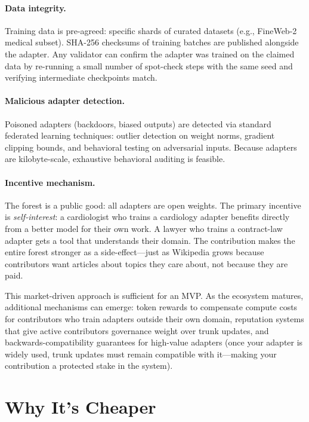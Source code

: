 \documentclass[11pt]{article}
\begin{document}
\paragraph{Data integrity.}
Training data is pre-agreed: specific shards of curated datasets (e.g.,
FineWeb-2 medical subset). SHA-256 checksums of training batches are
published alongside the adapter. Any validator can confirm the adapter was
trained on the claimed data by re-running a small number of spot-check
steps with the same seed and verifying intermediate checkpoints match.

\paragraph{Malicious adapter detection.}
Poisoned adapters (backdoors, biased outputs) are detected via standard
federated learning techniques: outlier detection on weight norms, gradient
clipping bounds, and behavioral testing on adversarial inputs. Because
adapters are kilobyte-scale, exhaustive behavioral auditing is feasible.

\paragraph{Incentive mechanism.}
The forest is a public good: all adapters are open weights. The primary
incentive is \emph{self-interest}: a cardiologist who trains a cardiology
adapter benefits directly from a better model for their own work. A lawyer
who trains a contract-law adapter gets a tool that understands their
domain. The contribution makes the entire forest stronger as a
side-effect---just as Wikipedia grows because contributors want articles
about topics they care about, not because they are paid.

This market-driven approach is sufficient for an MVP. As the ecosystem
matures, additional mechanisms can emerge: token rewards to compensate
compute costs for contributors who train adapters outside their own domain,
reputation systems that give active contributors governance weight over
trunk updates, and backwards-compatibility guarantees for high-value
adapters (once your adapter is widely used, trunk updates must remain
compatible with it---making your contribution a protected stake in the
system).

\section{Why It's Cheaper}
\end{document}
